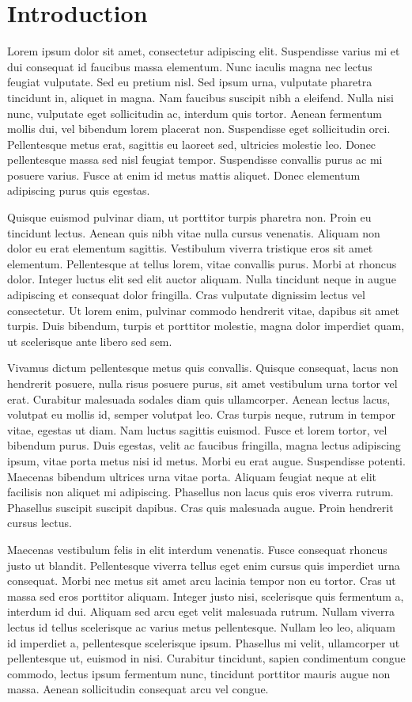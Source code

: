 \section{Introduction}
Lorem ipsum dolor sit amet, consectetur adipiscing elit. Suspendisse varius mi et dui consequat id faucibus massa elementum. Nunc iaculis magna nec lectus feugiat vulputate. Sed eu pretium nisl. Sed ipsum urna, vulputate pharetra tincidunt in, aliquet in magna. Nam faucibus suscipit nibh a eleifend. Nulla nisi nunc, vulputate eget sollicitudin ac, interdum quis tortor. Aenean fermentum mollis dui, vel bibendum lorem placerat non. Suspendisse eget sollicitudin orci. Pellentesque metus erat, sagittis eu laoreet sed, ultricies molestie leo. Donec pellentesque massa sed nisl feugiat tempor. Suspendisse convallis purus ac mi posuere varius. Fusce at enim id metus mattis aliquet. Donec elementum adipiscing purus quis egestas.

Quisque euismod pulvinar diam, ut porttitor turpis pharetra non. Proin eu tincidunt lectus. Aenean quis nibh vitae nulla cursus venenatis. Aliquam non dolor eu erat elementum sagittis. Vestibulum viverra tristique eros sit amet elementum. Pellentesque at tellus lorem, vitae convallis purus. Morbi at rhoncus dolor. Integer luctus elit sed elit auctor aliquam. Nulla tincidunt neque in augue adipiscing et consequat dolor fringilla. Cras vulputate dignissim lectus vel consectetur. Ut lorem enim, pulvinar commodo hendrerit vitae, dapibus sit amet turpis. Duis bibendum, turpis et porttitor molestie, magna dolor imperdiet quam, ut scelerisque ante libero sed sem.

Vivamus dictum pellentesque metus quis convallis. Quisque consequat, lacus non hendrerit posuere, nulla risus posuere purus, sit amet vestibulum urna tortor vel erat. Curabitur malesuada sodales diam quis ullamcorper. Aenean lectus lacus, volutpat eu mollis id, semper volutpat leo. Cras turpis neque, rutrum in tempor vitae, egestas ut diam. Nam luctus sagittis euismod. Fusce et lorem tortor, vel bibendum purus. Duis egestas, velit ac faucibus fringilla, magna lectus adipiscing ipsum, vitae porta metus nisi id metus. Morbi eu erat augue. Suspendisse potenti. Maecenas bibendum ultrices urna vitae porta. Aliquam feugiat neque at elit facilisis non aliquet mi adipiscing. Phasellus non lacus quis eros viverra rutrum. Phasellus suscipit suscipit dapibus. Cras quis malesuada augue. Proin hendrerit cursus lectus.

Maecenas vestibulum felis in elit interdum venenatis. Fusce consequat rhoncus justo ut blandit. Pellentesque viverra tellus eget enim cursus quis imperdiet urna consequat. Morbi nec metus sit amet arcu lacinia tempor non eu tortor. Cras ut massa sed eros porttitor aliquam. Integer justo nisi, scelerisque quis fermentum a, interdum id dui. Aliquam sed arcu eget velit malesuada rutrum. Nullam viverra lectus id tellus scelerisque ac varius metus pellentesque. Nullam leo leo, aliquam id imperdiet a, pellentesque scelerisque ipsum. Phasellus mi velit, ullamcorper ut pellentesque ut, euismod in nisi. Curabitur tincidunt, sapien condimentum congue commodo, lectus ipsum fermentum nunc, tincidunt porttitor mauris augue non massa. Aenean sollicitudin consequat arcu vel congue.

